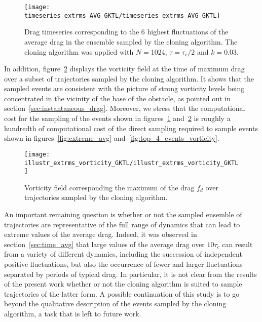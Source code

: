 \begin{figure}
  \centering
  \texttt{[image: timeseries\_extrms\_AVG\_GKTL/timeseries\_extrms\_AVG\_GKTL]}
  \caption{Drag timeseries corresponding to the 6 highest fluctuations of the average drag in the ensemble sampled by the cloning algorithm. The cloning algorithm was applied with $N = 1024$, $\tau = \tau_c / 2$ and $k = 0.03$. }
  \label{fig:timeseries_extrms_AVG_GKTL}
\end{figure}

In addition, figure~\ref{fig:illustr_extrms_vorticity_GKTL} displays the vorticity field at the time of maximum drag over a subset of trajectories
sampled by the cloning algorithm.
It shows that the sampled events are consistent with the picture of strong vorticity levels being concentrated in the vicinity of the base of the obstacle, as pointed out in section~\ref{sec:instantaneous_drag}.
Moreover, we stress that the computational cost for the sampling of the events shown in figures~\ref{fig:timeseries_extrms_AVG_GKTL} and~\ref{fig:illustr_extrms_vorticity_GKTL} is roughly a hundredth of computational cost of the direct sampling required to sample events shown in figures~\ref{fig:extreme_avg} and~\ref{fig:top_4_events_vorticity}.

\begin{figure}
  \centering
  \texttt{[image: illustr\_extrms\_vorticity\_GKTL/illustr\_extrms\_vorticity\_GKTL]}
  \caption{Vorticity field corresponding the maximum of the drag $f_d$ over trajectories sampled by the cloning algorithm.}
  \label{fig:illustr_extrms_vorticity_GKTL}
\end{figure}

An important remaining question is whether or not the sampled ensemble of trajectories are representative of the full range of dynamics that can lead to extreme values of the average drag.
Indeed, it was observed in section~\ref{sec:time_avg} that large values of the average drag over $10\tau_c$ can result from a variety of different
dynamics, including the succession of independent positive fluctuations, but also the occurrence of fewer and larger fluctuations separated by periods of typical drag.
In particular, it is not clear from the results of the present work whether or not the cloning algorithm is suited to sample trajectories of the latter form.
A possible continuation of this study is to go beyond the qualitative description of the events sampled by the cloning algorithm, a task that is left to future work.

